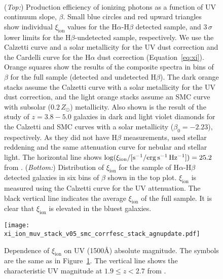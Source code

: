 \documentclass[iop]{emulateapj}
\newcommand{\xiion}{\ensuremath{\xi_{\mathrm{ion}}}}
\newcommand{\halpha}{H\ensuremath{\alpha}}
\newcommand{\hbeta}{H\ensuremath{\beta}}
\begin{document}
\begin{figure}[tbp]
	\\
		\caption{ ({\em Top:}) Production efficiency of ionizing photons as a function of UV continuum slope, $\beta$. Small blue circles and red upward triangles show individual {\xiion} values for the {\halpha}-{\hbeta} detected sample, and $3\,\sigma$ lower limits for the {\hbeta}-undetected sample, respectively. 
		We use the Calzetti curve and a solar metallicity for the UV dust correction and the Cardelli curve for the {\halpha} dust correction (Equation~\ref{eq:xi}). Orange squares show the results of the composite spectra in bins of $\beta$ for the full sample (detected and undetected {\hbeta}). The dark orange stacks assume the Calzetti curve with a solar metallicity for the UV dust correction, and the light orange stacks assume an SMC curve with subsolar ($0.2\,Z_{\odot}$) metallicity. 
		Also shown is the result of the \citet{bouwens15b} study of $z=3.8-5.0$ galaxies in dark and light violet diamonds for the Calzetti and SMC curves with a solar metallicity ($\beta_0=-2.23$), respectively. As they did not have {\hbeta} measurements, \citet{bouwens15b} used stellar reddening and the same attenuation curve for nebular and stellar light.
		The horizontal line shows $\log(\xi_{\rm{ion}}/[{\rm{s^{-1}/erg\,s^{-1}\,Hz^{-1}}}])=25.2$ from \citet{robertson13}.
		({\em Bottom:}) Distribution of {\xiion} for the sample of {\halpha}-{\hbeta} detected galaxies in six bins of $\beta$ shown in the top plot. {\xiion} is measured using the Calzetti curve for the UV attenuation. The black vertical  line indicates the average {\xiion} of the full sample. It is clear that {\xiion} is elevated in the bluest galaxies.
		}
		\label{fig:beta}
\end{figure}

\begin{figure}[tbp]
	\centering
		\texttt{[image: xi\_ion\_muv\_stack\_v05\_smc\_corrfesc\_stack\_agnupdate.pdf]}
		\caption{Dependence of {\xiion} on UV (1500\AA) absolute magnitude.
		The symbols are the same as in Figure~\ref{fig:beta}. The vertical line shows the characteristic UV magnitude at $1.9\leq z<2.7$ from \citet{reddy09}.
		}
		\label{fig:muv}
\end{figure}
\end{document}

